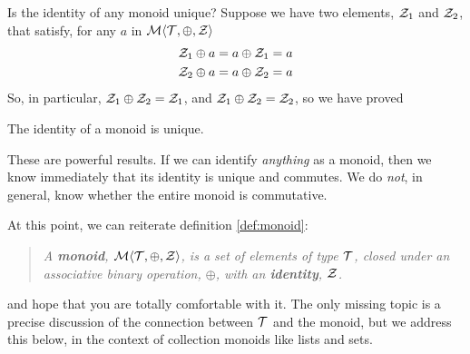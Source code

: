 Is the identity of any monoid unique? Suppose we have two elements, $\mathcal{Z}_1$ and $\mathcal{Z}_2$, that satisfy, for any $a$ in $\mathcal{M}\langle{\mathcal{T}},{\oplus},{\mathcal{Z}}\rangle$
\begin{eqnarray}
	\nonumber \mathcal{Z}_1\oplus a=a\oplus\mathcal{Z}_1=a\\
	\nonumber \mathcal{Z}_2\oplus a=a\oplus\mathcal{Z}_2=a
\end{eqnarray}
So, in particular, $\mathcal{Z}_1\oplus\mathcal{Z}_2=\mathcal{Z}_1$, and $\mathcal{Z}_1\oplus\mathcal{Z}_2=\mathcal{Z}_2$, so we have proved
\begin{lemma}
  The identity of a monoid is unique.
\end{lemma}


These are powerful results. If we can identify \emph{anything} as a monoid, then we know immediately that its identity is unique and commutes. We do \emph{not}, in general, know whether the entire monoid is commutative. 


At this point, we can reiterate definition \ref{def:monoid}:
\begin{quote}
\emph{A \textbf{monoid}, $\mathcal{M}\langle{\mathcal{T}},{\oplus},{\mathcal{Z}}\rangle$, is a set of elements of type $\mathcal{T}$, closed under an associative binary operation, $\oplus$, with an \textbf{identity}, $\mathcal{Z}$. }
\end{quote}
and hope that you are totally comfortable with it. The only missing topic is a precise discussion of the connection between $\mathcal{T}$ and the monoid, but we address this below, in the context of collection monoids like lists and sets. 

